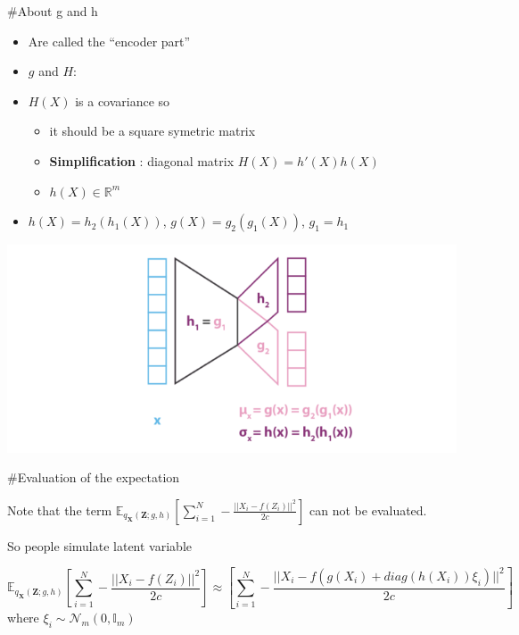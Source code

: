 \documentclass[
  ignorenonframetext,
]{beamer}
\providecommand{\tightlist}{%
  \setlength{\itemsep}{0pt}\setlength{\parskip}{0pt}}
\begin{document}
\begin{frame}
\#About g and h

\begin{itemize}
\item
  Are called the ``encoder part''
\item
  \(g\) and \(H\):
\item
  \(H(X)\) is a covariance so

  \begin{itemize}
  \tightlist
  \item
    it should be a square symetric matrix
  \item
    \textbf{Simplification} : diagonal matrix \(H(X) = h'(X)h(X)\)
  \item
    \(h(X) \in \mathbb{R}^m\)
  \end{itemize}
\item
  \(h(X) = h_2(h_1(X))\), \(g(X) = g_2(g_1(X))\), \(g_1 = h_1\)
\end{itemize}

\begin{center}\includegraphics[width=0.9\linewidth]{images/approxZ} \end{center}
\end{frame}

\begin{frame}
\#Evaluation of the expectation

Note that the term
\(\mathbb{E}_{q_{\mathbf{X}}(\mathbf{Z};g,h)} \left[\sum_{i=1}^N - \frac{||X_i - f(Z_i)||^2}{2c}\right]\)
can not be evaluated.

So people simulate latent variable

\[\mathbb{E}_{q_{\mathbf{X}}(\mathbf{Z};g,h)}  \left[\sum_{i=1}^N - \frac{||X_i - f(Z_i)||^2}{2c}\right] \approx  \left[\sum_{i=1}^N - \frac{||X_i - f(g(X_i) + diag(h(X_i))\xi_i)||^2}{2c}\right]\]
where \(\xi_i\sim \mathcal{N}_m(0,\mathbb{I}_m)\)
\end{frame}
\end{document}
